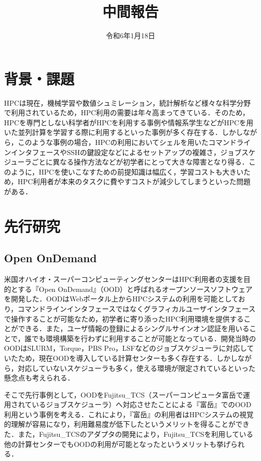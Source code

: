 \documentclass[a4paper,oneside,twocolumn,notitlepage,dvipdfmx]{jsarticle}
\date{令和6年1月18日}
\title{中間報告}
\begin{document}
\maketitle
\section{背景・課題}
HPCは現在，機械学習や数値シュミレーション，統計解析など様々な科学分野で利用されているため，HPC利用の需要は年々高まってきている．そのため，HPCを専門としない科学者がHPCを利用する事例や情報系学生などがHPCを用いた並列計算を学習する際に利用するといった事例が多く存在する．しかしながら，このような事例の場合，HPCの利用においてシェルを用いたコマンドラインインタフェースやSSHの鍵設定などによるセットアップの複雑さ，ジョブスケジューラごとに異なる操作方法などが初学者にとって大きな障害となり得る．このように，HPCを使いこなすための前提知識は幅広く，学習コストも大きいため，HPC利用者が本来のタスクに費やすコストが減少してしまうといった問題がある．\par


\section{先行研究}
\subsection{Open OnDemand}
米国オハイオ・スーパーコンピューティングセンターはHPC利用者の支援を目的とする『Open OnDemand』（OOD）と呼ばれるオープンソースソフトウェアを開発した\cite{citation_2}\cite{citation_3}\cite{citation_4}\cite{citation_5}．OODはWebポータル上からHPCシステムの利用を可能としており，コマンドラインインタフェースではなくグラフィカルユーザインタフェースで操作することが可能なため，初学者に寄り添ったHPC利用環境を提供することができる．また，ユーザ情報の登録によるシングルサインオン認証を用いることで，誰でも環境構築を行わずに利用することが可能となっている．開発当時のOODはSLURM，Torque，PBS Pro，LSFなどのジョブスケジューラに対応していたため，現在OODを導入している計算センターも多く存在する．しかしながら，対応していないスケジューラも多く，使える環境が限定されているといった懸念点も考えられる．\par
そこで先行事例として，OODをFujitsu\_TCS（スーパーコンピュータ富岳で運用されているジョブスケジューラ）へ対応させたことによる『富岳』でのOOD利用という事例を考える\cite{citation_1}．これにより，『富岳』の利用者はHPCシステムの視覚的理解が容易になり，利用難易度が低下したというメリットを得ることができた．また，Fujitsu\_TCSのアダプタの開発により，Fujitsu\_TCSを利用している他の計算センターでもOODの利用が可能となったというメリットも挙げられる．\par
\end{document}
